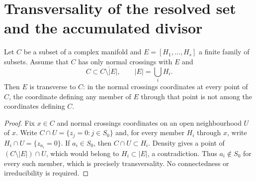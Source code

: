 \section{Transversality of the resolved set and the accumulated divisor}

\begin{lemma}
\label{hir:nc-density-transverse}
\leanok
Let \(C\) be a subset of a complex manifold and \(E=[H_1,\ldots,H_s]\) a finite family of subsets. Assume that \(C\) has only normal crossings with \(E\) and
\[
 C\subset\overline{C\setminus|E|},\qquad |E|=\bigcup_i H_i.
\]
Then \(E\) is transverse to \(C\): in the normal crossings coordinates at every point of \(C\), the coordinate defining any member of \(E\) through that point is not among the coordinates defining \(C\).
\end{lemma}
\begin{proof}
Fix \(x\in C\) and normal crossings coordinates on an open neighbourhood \(U\) of \(x\). Write \(C\cap U=\{z_j=0:j\in S_0\}\) and, for every member \(H_i\) through \(x\), write \(H_i\cap U=\{z_{a_i}=0\}\). If \(a_i\in S_0\), then \(C\cap U\subset H_i\). Density gives a point of \((C\setminus|E|)\cap U\), which would belong to \(H_i\subset|E|\), a contradiction. Thus \(a_i\notin S_0\) for every such member, which is precisely transversality. No connectedness or irreducibility is required.
\end{proof}

